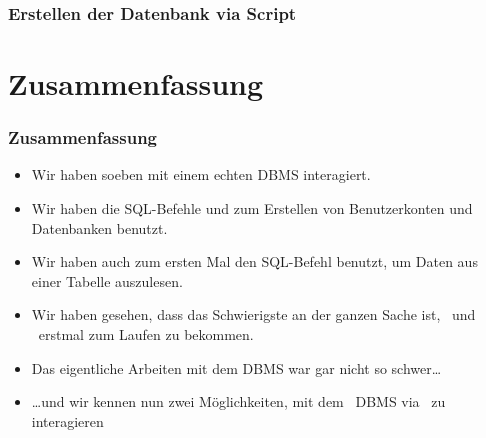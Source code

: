 \documentclass[aspectratio=169,mathserif,notheorems]{beamer}%
\begin{document}
%
\begin{frame}%
\frametitle{Erstellen der Datenbank via Script}%
\end{frame}
%
\section{Zusammenfassung}%
%
\begin{frame}%
\frametitle{Zusammenfassung}%
\begin{itemize}%
\item Wir haben soeben mit einem echten DBMS interagiert.%
\item<2-> Wir haben die SQL-Befehle  und  zum Erstellen von Benutzerkonten und Datenbanken benutzt.%
\item<3-> Wir haben auch zum ersten Mal den SQL-Befehl  benutzt, um Daten aus einer Tabelle auszulesen.%
\item<4-> Wir haben gesehen, dass das Schwierigste an der ganzen Sache ist, \postgresql\ und \psql\ erstmal zum Laufen zu bekommen.%
\item<5-> Das eigentliche Arbeiten mit dem DBMS war gar nicht so schwer\dots%
\item<6-> {\dots}und wir kennen nun zwei Möglichkeiten, mit dem \postgresql\ DBMS via \psql\ zu interagieren%
\end{itemize}%
\end{frame}%
%
\endPresentation%
\end{document}
